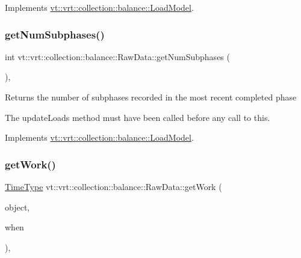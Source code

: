 Implements \hyperlink{structvt_1_1vrt_1_1collection_1_1balance_1_1_load_model_ac061725720a2017908090863080b70e5}{vt\+::vrt\+::collection\+::balance\+::\+Load\+Model}.

\mbox{\label{structvt_1_1vrt_1_1collection_1_1balance_1_1_raw_data_aeb7830328dfb72f11740e79eed6a23aa}} 
\subsubsection{\texorpdfstring{get\+Num\+Subphases()}{getNumSubphases()}}
{\footnotesize\ttfamily int vt\+::vrt\+::collection\+::balance\+::\+Raw\+Data\+::get\+Num\+Subphases (\begin{DoxyParamCaption}{ }\end{DoxyParamCaption})\hspace{0.3cm}{\ttfamily [override]}, {\ttfamily [virtual]}}

Returns the number of subphases recorded in the most recent completed phase

The {\ttfamily update\+Loads} method must have been called before any call to this. 

Implements \hyperlink{structvt_1_1vrt_1_1collection_1_1balance_1_1_load_model_ab46ea62e4228d4a64de9dd0adfe81af2}{vt\+::vrt\+::collection\+::balance\+::\+Load\+Model}.

\mbox{\label{structvt_1_1vrt_1_1collection_1_1balance_1_1_raw_data_a2fc0e286efee8f9950a7a8ff13f3261d}} 
\subsubsection{\texorpdfstring{get\+Work()}{getWork()}}
{\footnotesize\ttfamily \hyperlink{namespacevt_a876a9d0cd5a952859c72de8a46881442}{Time\+Type} vt\+::vrt\+::collection\+::balance\+::\+Raw\+Data\+::get\+Work (\begin{DoxyParamCaption}\item[{\hyperlink{namespacevt_1_1vrt_1_1collection_1_1balance_a9f5b53fafb270212279a4757d2c4cd28}{Element\+I\+D\+Struct}}]{object,  }\item[{\hyperlink{structvt_1_1vrt_1_1collection_1_1balance_1_1_phase_offset}{Phase\+Offset}}]{when }\end{DoxyParamCaption})\hspace{0.3cm}{\ttfamily [override]}, {\ttfamily [virtual]}}



